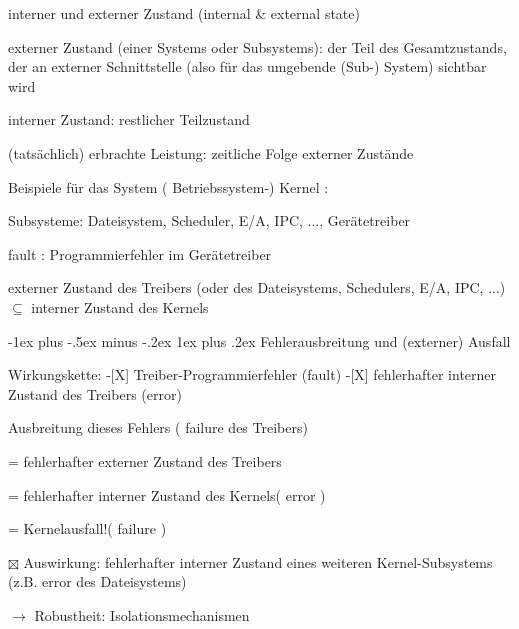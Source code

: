 \documentclass[a4paper]{article}
\makeatletter
\renewcommand{\subsubsection}{\@startsection{subsubsection}{3}{0mm}%
 {-1ex plus -.5ex minus -.2ex}%
 {1ex plus .2ex}%
 {\normalfont\small\bfseries}}
\makeatother
\begin{document}
\begin{multicols}{3}
    \begin{itemize*}
        \item
        interner und externer Zustand (internal \& external state)
        \begin{itemize*}
            \item externer Zustand (einer Systems oder Subsystems): der Teil des Gesamtzustands, der an externer Schnittstelle (also für das umgebende (Sub-) System) sichtbar wird
            \item interner Zustand: restlicher Teilzustand
            \item (tatsächlich) erbrachte Leistung: zeitliche Folge externer Zustände
        \end{itemize*}
        \item
        Beispiele für das System ( Betriebssystem-) Kernel :
        \begin{itemize*}
            \item Subsysteme: Dateisystem, Scheduler, E/A, IPC, ..., Gerätetreiber
            \item fault : Programmierfehler im Gerätetreiber
            \item externer Zustand des Treibers (oder des Dateisystems, Schedulers, E/A, IPC, ...) $\subseteq$ interner Zustand des Kernels
        \end{itemize*}
    \end{itemize*}


    \subsubsection{Fehlerausbreitung und (externer)
        Ausfall}

    \begin{itemize*}
        \item
        Wirkungskette: -[X] Treiber-Programmierfehler (fault) -[X]
        fehlerhafter interner Zustand des Treibers (error)
        \begin{itemize*}
            \item Ausbreitung dieses Fehlers ( failure des Treibers)
            \item = fehlerhafter externer Zustand des Treibers
            \item = fehlerhafter interner Zustand des Kernels( error )
            \item = Kernelausfall!( failure )
        \end{itemize*}
        \item[$\boxtimes$]
        Auswirkung: fehlerhafter interner Zustand eines weiteren
        Kernel-Subsystems (z.B. error des Dateisystems)
        \item
        $\rightarrow$ Robustheit: Isolationsmechanismen
        \item
    \end{itemize*}



\end{multicols}
\end{document}
